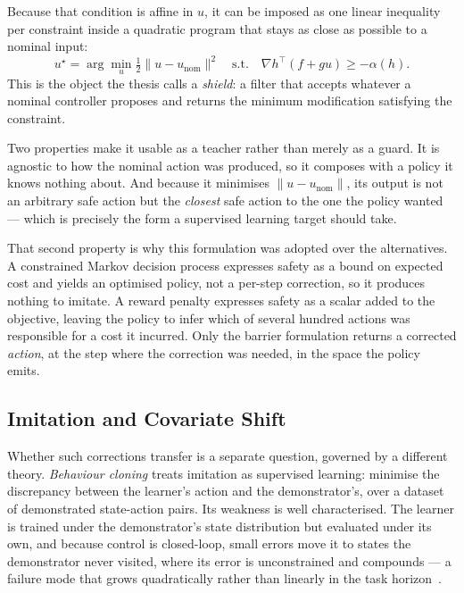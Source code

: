 \documentclass[a4paper,11pt]{report}
\begin{document}
Because that condition is affine in $u$, it can be imposed as one linear inequality per constraint
inside a quadratic program that stays as close as possible to a nominal input:
\begin{equation}
  u^{\star} = \arg\min_{u} \tfrac{1}{2}\lVert u - u_{\mathrm{nom}} \rVert^{2}
  \quad \text{s.t.} \quad
  \nabla h^{\top}\!\left(f + gu\right) \ge -\alpha(h).
  \label{eq:cbf_qp}
\end{equation}
This is the object the thesis calls a \emph{shield}: a filter that accepts whatever a nominal
controller proposes and returns the minimum modification satisfying the constraint.

Two properties make it usable as a teacher rather than merely as a guard. It is agnostic to how the
nominal action was produced, so it composes with a policy it knows nothing about. And because it
minimises $\lVert u - u_{\mathrm{nom}}\rVert$, its output is not an arbitrary safe action but the
\emph{closest} safe action to the one the policy wanted --- which is precisely the form a
supervised learning target should take.

That second property is why this formulation was adopted over the alternatives. A constrained
Markov decision process expresses safety as a bound on expected cost and yields an optimised
policy, not a per-step correction, so it produces nothing to imitate. A reward penalty expresses
safety as a scalar added to the objective, leaving the policy to infer which of several hundred
actions was responsible for a cost it incurred. Only the barrier formulation returns a corrected
\emph{action}, at the step where the correction was needed, in the space the policy emits.

\subsection{Imitation and Covariate Shift}

Whether such corrections transfer is a separate question, governed by a different theory.
\emph{Behaviour cloning} treats imitation as supervised learning: minimise the discrepancy between
the learner's action and the demonstrator's, over a dataset of demonstrated state-action pairs. Its
weakness is well characterised. The learner is trained under the demonstrator's state distribution
but evaluated under its own, and because control is closed-loop, small errors move it to states the
demonstrator never visited, where its error is unconstrained and compounds --- a failure mode that
grows quadratically rather than linearly in the task horizon~\cite{ross2011dagger}.
\end{document}
